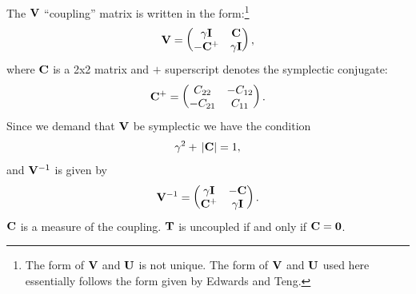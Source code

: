 The ${\bf V}$ ``coupling'' matrix is written in the form:\footnote
  {
The form of ${\bf V}$ and ${\bf U}$ is not unique. The form of ${\bf V}$ and ${\bf U}$ used here essentially
follows the form given by Edwards and Teng\cite{b:edteng}.
  }
  \begin{equation}
    {\bf V} = 
    \begin{pmatrix}
        \gamma {\bf I} & {\bf C} \cr 
        -{\bf C}^+     & \gamma {\bf I} \cr
    \end{pmatrix}
    , \label{vgicc1}
  \end{equation}
where ${\bf C}$ is a 2x2 matrix and $+$ superscript denotes the symplectic conjugate:
  \begin{equation}
    {\bf C}^+ = 
    \begin{pmatrix}
       C_{22} & -C_{12} \cr 
      -C_{21} & C_{11} \cr
    \end{pmatrix}
    . \label{ccccc}
  \end{equation}
Since we demand that ${\bf V}$ be symplectic we have the condition
  \begin{equation}               
    \gamma^2 + \, |{\bf C}| = 1
    , \label{gc1}
  \end{equation}
and ${\bf V}^{-1}$ is given by
  \begin{equation}
    {\bf V}^{-1} = 
    \begin{pmatrix}
      \gamma {\bf I} & -{\bf C} \cr 
      {\bf C}^+ & \gamma {\bf I} \cr
    \end{pmatrix}
    . \label{vgicc2}
  \end{equation} 
${\bf C}$ is a measure of the coupling. ${\bf T}$ is uncoupled if and only if ${\bf C} = {\bf 0}$.

